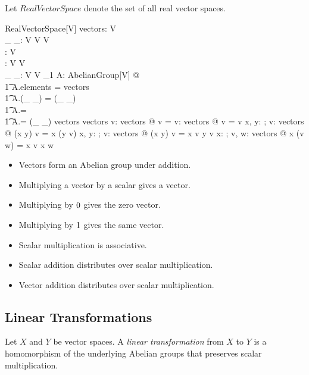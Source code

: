 \documentclass[12pt]{article}
\begin{document}
Let $RealVectorSpace$ denote the set of all real vector spaces.

\begin{schema}{RealVectorSpace}[V]
vectors: \power V \\
\_ \addV \_: V \cross V \pfun V \\
\zeroV: V \\
\negV: V \pfun V \\
\_ \mulS \_: \RR \cross V \pfun V
\where
\exists_1 A: AbelianGroup[V] @ \\
\t1	A.elements = vectors \land \\
\t1	A.(\_ \addG \_) = (\_ \addV \_) \land \\
\t1	A.\zeroG = \zeroV \land \\
\t1	A.\negG = \negV
\also
(\_ \mulS \_) \in \RR \cross vectors \fun vectors
\also
\forall v: vectors @ \zeroR \mulS v = \zeroV
\also
\forall v: vectors @ \oneR \mulS v = v
\also
\forall x, y: \RR; v: vectors @ (x \mulR y) \mulS v = x \mulS (y \mulS v)
\also
\forall x, y: \RR; v: vectors @ (x \addR y) \mulS v = x \mulS v \addV y \mulS v
\also
\forall x: \RR; v, w: vectors @ x \mulS (v \addV w) = x \mulS v \addV x \mulS w
\end{schema}

\begin{itemize}
\item Vectors form an Abelian group under addition.
\item Multiplying a vector by a scalar gives a vector.
\item Multiplying by $0$ gives the zero vector.
\item Multiplying by $1$ gives the same vector.
\item Scalar multiplication is associative.
\item Scalar addition distributes over scalar multiplication.
\item Vector addition distributes over scalar multiplication.
\end{itemize}

\subsection{Linear Transformations}

Let $X$ and $Y$ be vector spaces.
A {\em linear transformation} from $X$ to $Y$ is a homomorphism of the underlying Abelian groups
that preserves scalar multiplication.
\end{document}
